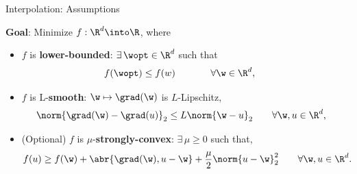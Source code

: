 \documentclass[mathserif,notheorems, hyperref={colorlinks, urlcolor=blue, linkcolor=blue}]{beamer}
\begin{document}
    \begin{frame}{Interpolation: Assumptions}
        \begin{center}
            \Large 
            \textbf{Goal}: Minimize \( f : \R^d \into \R\), where 
        \end{center}
       
        \vspace{3ex}
        
        \begin{itemize}
            \item \( f \) is \textbf{lower-bounded}: \( \exists \, \wopt \in \R^d \) such that
                \begin{align*}
                    f(\wopt) &\leq f(w) \hspace{1.7em} \tag*{\(\forall \w \in \R^d \), } 
                \end{align*}

            \item \( f \) is L-\textbf{smooth}: \( \w \mapsto \grad(\w) \) is \( L \)-Lipschitz, 
                \begin{align*}
                    \norm{\grad(\w) - \grad(u)}_2 &\leq L \norm{\w - u}_2 \tag*{\(\forall \w, u \in \R^d \),} 
                \end{align*}

            \item (Optional) \( f \) is \( \mu \)-\textbf{strongly-convex}: \( \exists \, \mu \geq 0 \) such that, 
                \begin{align*}
                   f(u) \geq f(\w) + \abr{\grad(\w), u - \w} + \frac{\mu}{2} \norm{u - \w}^2_2 \tag*{\( \forall \w, u \in \R^d \).}
                \end{align*}
        \end{itemize}
     
    \end{frame}
\end{document}
